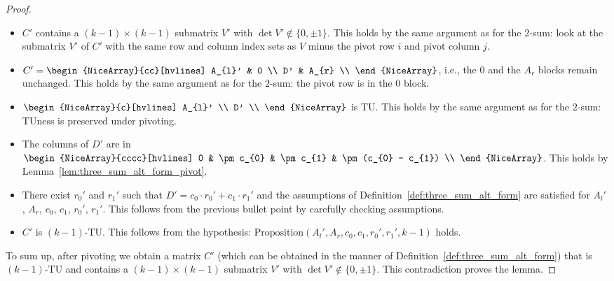 \documentclass{article}
\theoremstyle{definition}
\begin{document}
\begin{proof}
    \begin{itemize}
        \item $C'$ contains a $(k - 1) \times (k - 1)$ submatrix $V'$ with $\det V' \notin \{0, \pm 1\}$. This holds by the same argument as for the $2$-sum: look at the submatrix $V'$ of $C'$ with the same row and column index sets as $V$ minus the pivot row $i$ and pivot column $j$.
        \item $C' = \begin{NiceArray}{cc}[hvlines] A_{l}' & 0 \\ D' & A_{r} \\ \end{NiceArray}$, i.e., the $0$ and the $A_{r}$ blocks remain unchanged. This holds by the same argument as for the $2$-sum: the pivot row is in the $0$ block.
        \item $\begin{NiceArray}{c}[hvlines] A_{l}' \\ D' \\ \end{NiceArray}$ is TU. This holds by the same argument as for the $2$-sum: TUness is preserved under pivoting.
        \item The columns of $D'$ are in $\begin{NiceArray}{cccc}[hvlines] 0 & \pm c_{0} & \pm c_{1} & \pm (c_{0} - c_{1}) \\ \end{NiceArray}$. This holds by Lemma~\ref{lem:three_sum_alt_form_pivot}.
        \item There exist $r_{0}'$ and $r_{1}'$ such that $D' = c_{0} \cdot r_{0}' + c_{1} \cdot r_{1}'$ and the assumptions of Definition~\ref{def:three_sum_alt_form} are satisfied for $A_{l}'$, $A_{r}$, $c_{0}$, $c_{1}$, $r_{0}'$, $r_{1}'$. This follows from the previous bullet point by carefully checking assumptions.
        \item $C'$ is $(k - 1)$-TU. This follows from the hypothesis: $\mathrm{Proposition}(A_{l}', A_{r}, c_{0}, c_{1}, r_{0}', r_{1}', k - 1)$ holds.
    \end{itemize}

    To sum up, after pivoting we obtain a matrix $C'$ (which can be obtained in the manner of Definition~\ref{def:three_sum_alt_form}) that is $(k - 1)$-TU and contains a $(k - 1) \times (k - 1)$ submatrix $V'$ with $\det V' \notin \{0, \pm 1\}$. This contradiction proves the lemma.
\end{proof}
\end{document}
